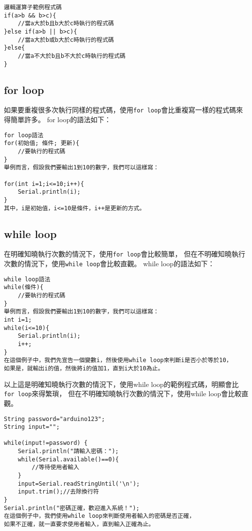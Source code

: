 \documentclass[12pt,a4paper]{article}
\begin{document}
\begin{lstlisting}
邏輯運算子範例程式碼
if(a>b && b>c){
    //當a大於b且b大於c時執行的程式碼
}else if(a>b || b>c){
    //當a大於b或b大於c時執行的程式碼
}else{
    //當a不大於b且b不大於c時執行的程式碼
}
\end{lstlisting}

\subsection{for loop}
如果要重複很多次執行同樣的程式碼，使用\texttt{for loop}會比重複寫一樣的程式碼來得簡單許多。
for loop的語法如下：
\begin{lstlisting}
for loop語法
for(初始值; 條件; 更新){
    //要執行的程式碼
}
舉例而言，假設我們要輸出1到10的數字，我們可以這樣寫：

for(int i=1;i<=10;i++){
    Serial.println(i);
}
其中，i是初始值，i<=10是條件，i++是更新的方式。
\end{lstlisting}

\subsection{while loop}
在明確知曉執行次數的情況下，使用\texttt{for loop}會比較簡單，
但在不明確知曉執行次數的情況下，使用\texttt{while loop}會比較直觀。
while loop的語法如下：
\begin{lstlisting}
while loop語法
while(條件){
    //要執行的程式碼
}
舉例而言，假設我們要輸出1到10的數字，我們可以這樣寫：
int i=1;
while(i<=10){
    Serial.println(i);
    i++;
}
在這個例子中，我們先宣告一個變數i，然後使用while loop來判斷i是否小於等於10，
如果是，就輸出i的值，然後將i的值加1，直到i大於10為止。
\end{lstlisting}
以上這是明確知曉執行次數的情況下，使用while loop的範例程式碼，明顯會比\texttt{for loop}來得繁瑣，
但在不明確知曉執行次數的情況下，使用while loop會比較直觀。
\begin{lstlisting}
String password="arduino123";
String input="";

while(input!=password) {
    Serial.println("請輸入密碼：");
    while(Serial.available()==0){
        //等待使用者輸入
    }
    input=Serial.readStringUntil('\n');
    input.trim();//去除換行符
}
Serial.println("密碼正確，歡迎進入系統！");
在這個例子中，我們使用while loop來判斷使用者輸入的密碼是否正確，
如果不正確，就一直要求使用者輸入，直到輸入正確為止。
\end{lstlisting}
\end{document}

